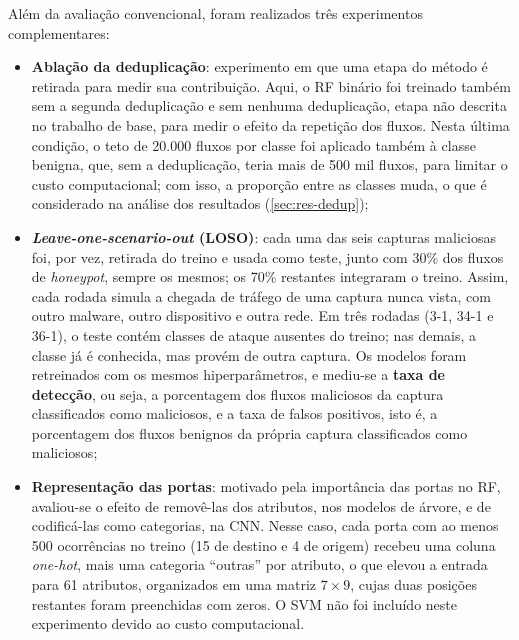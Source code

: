 \documentclass[alpha-refs,brazilian]{CC-EC_TF-TC}
\begin{document}
Além da avaliação convencional, foram realizados três experimentos complementares:
\begin{itemize}
    \item \textbf{Ablação da deduplicação}: experimento em que uma etapa do método é retirada para medir sua contribuição. Aqui, o RF binário foi treinado também sem a segunda deduplicação e sem nenhuma deduplicação, etapa não descrita no trabalho de base, para medir o efeito da repetição dos fluxos. Nesta última condição, o teto de 20.000 fluxos por classe foi aplicado também à classe benigna, que, sem a deduplicação, teria mais de 500 mil fluxos, para limitar o custo computacional; com isso, a proporção entre as classes muda, o que é considerado na análise dos resultados (\autoref{sec:res-dedup});
    \item \textbf{\textit{Leave-one-scenario-out} (LOSO)}: cada uma das seis capturas maliciosas foi, por vez, retirada do treino e usada como teste, junto com 30\% dos fluxos de \textit{honeypot}, sempre os mesmos; os 70\% restantes integraram o treino. Assim, cada rodada simula a chegada de tráfego de uma captura nunca vista, com outro malware, outro dispositivo e outra rede. Em três rodadas (3-1, 34-1 e 36-1), o teste contém classes de ataque ausentes do treino; nas demais, a classe já é conhecida, mas provém de outra captura. Os modelos foram retreinados com os mesmos hiperparâmetros, e mediu-se a \textbf{taxa de detecção}, ou seja, a porcentagem dos fluxos maliciosos da captura classificados como maliciosos, e a taxa de falsos positivos, isto é, a porcentagem dos fluxos benignos da própria captura classificados como maliciosos;
    \item \textbf{Representação das portas}: motivado pela importância das portas no RF, avaliou-se o efeito de removê-las dos atributos, nos modelos de árvore, e de codificá-las como categorias, na CNN. Nesse caso, cada porta com ao menos 500 ocorrências no treino (15 de destino e 4 de origem) recebeu uma coluna \textit{one-hot}, mais uma categoria ``outras'' por atributo, o que elevou a entrada para 61 atributos, organizados em uma matriz $7 \times 9$, cujas duas posições restantes foram preenchidas com zeros. O SVM não foi incluído neste experimento devido ao custo computacional.
\end{itemize}

\end{document}
